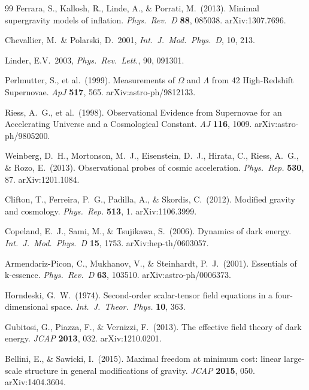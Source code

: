\documentclass[12pt,a4paper]{article}
\begin{document}
\begin{thebibliography}{99}
Ferrara, S., Kallosh, R., Linde, A., \& Porrati, M.\ (2013).
Minimal supergravity models of inflation.
\textit{Phys.\ Rev.\ D} \textbf{88}, 085038.
arXiv:1307.7696.

Chevallier, M.\ \& Polarski, D.\ 2001, \textit{Int.\ J.\ Mod.\ Phys.\ D}, 10, 213.

Linder, E.V.\ 2003, \textit{Phys.\ Rev.\ Lett.}, 90, 091301.

Perlmutter, S., et al.\ (1999).
Measurements of $\Omega$ and $\Lambda$ from 42 High-Redshift Supernovae.
\textit{ApJ} \textbf{517}, 565. arXiv:astro-ph/9812133.

Riess, A.~G., et al.\ (1998).
Observational Evidence from Supernovae for an Accelerating Universe and a Cosmological Constant.
\textit{AJ} \textbf{116}, 1009. arXiv:astro-ph/9805200.

Weinberg, D.~H., Mortonson, M.~J., Eisenstein, D.~J., Hirata, C., Riess, A.~G., \& Rozo, E.\ (2013).
Observational probes of cosmic acceleration.
\textit{Phys.\ Rep.} \textbf{530}, 87. arXiv:1201.1084.

Clifton, T., Ferreira, P.~G., Padilla, A., \& Skordis, C.\ (2012).
Modified gravity and cosmology.
\textit{Phys.\ Rep.} \textbf{513}, 1. arXiv:1106.3999.

Copeland, E.~J., Sami, M., \& Tsujikawa, S.\ (2006).
Dynamics of dark energy.
\textit{Int.\ J.\ Mod.\ Phys.\ D} \textbf{15}, 1753. arXiv:hep-th/0603057.

Armendariz-Picon, C., Mukhanov, V., \& Steinhardt, P.~J.\ (2001).
Essentials of k-essence.
\textit{Phys.\ Rev.\ D} \textbf{63}, 103510. arXiv:astro-ph/0006373.

Horndeski, G.~W.\ (1974).
Second-order scalar-tensor field equations in a four-dimensional space.
\textit{Int.\ J.\ Theor.\ Phys.} \textbf{10}, 363.

Gubitosi, G., Piazza, F., \& Vernizzi, F.\ (2013).
The effective field theory of dark energy.
\textit{JCAP} \textbf{2013}, 032. arXiv:1210.0201.

Bellini, E., \& Sawicki, I.\ (2015).
Maximal freedom at minimum cost: linear large-scale structure in general modifications of gravity.
\textit{JCAP} \textbf{2015}, 050. arXiv:1404.3604.


\end{thebibliography}
\end{document}
